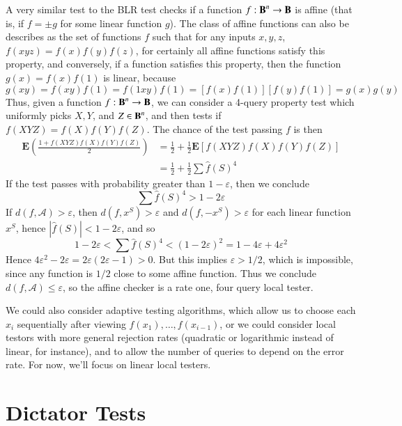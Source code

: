 \begin{example}
    A very similar test to the BLR test checks if a function $f: \operatorname{\mathbf{B}}^n \to \operatorname{\mathbf{B}}$ is affine (that is, if $f = \pm g$ for some linear function $g$). The class of affine functions can also be describes as the set of functions $f$ such that for any inputs $x,y,z$, $f(xyz) = f(x)f(y)f(z)$, for certainly all affine functions satisfy this property, and conversely, if a function satisfies this property, then the function $g(x) = f(x) f(1)$ is linear, because
    \[ g(xy) = f(xy) f(1) = f(1xy) f(1) = [f(x) f(1)] [f(y) f(1)] = g(x) g(y) \]
    Thus, given a function $f: \operatorname{\mathbf{B}}^n \to \operatorname{\mathbf{B}}$, we can consider a 4-query property test which uniformly picks $X,Y$, and $Z \in \operatorname{\mathbf{B}}^n$, and then tests if $f(XYZ) = f(X)f(Y)f(Z)$. The chance of the test passing $f$ is then
    \begin{align*}
        \mathbf{E} \left( \frac{1 + f(XYZ) f(X) f(Y) f(Z)}{2} \right) &= \frac{1}{2} + \frac{1}{2} \mathbf{E}[f(XYZ) f(X) f(Y) f(Z)]\\
        &= \frac{1}{2} + \frac{1}{2} \sum \widehat{f}(S)^4
    \end{align*}
    If the test passes with probability greater than $1 - \varepsilon$, then we conclude
    \[ \sum \widehat{f}(S)^4 > 1 - 2 \varepsilon \]
    If $d(f,\mathcal{A}) > \varepsilon$, then $d(f,x^S) > \varepsilon$ and $d(f,-x^S) > \varepsilon$ for each linear function $x^S$, hence $|\widehat{f}(S)| < 1 - 2 \varepsilon$, and so
    \[ 1 - 2 \varepsilon < \sum \widehat{f}(S)^4 < (1 - 2 \varepsilon)^2 = 1 - 4 \varepsilon + 4 \varepsilon^2 \]
    Hence $4 \varepsilon^2 - 2 \varepsilon = 2\varepsilon(2\varepsilon - 1) > 0$. But this implies $\varepsilon > 1/2$, which is impossible, since any function is $1/2$ close to some affine function. Thus we conclude $d(f,\mathcal{A}) \leq \varepsilon$, so the affine checker is a rate one, four query local tester.
\end{example}

We could also consider adaptive testing algorithms, which allow us to choose each $x_i$ sequentially after viewing $f(x_1), \dots, f(x_{i-1})$, or we could consider local testors with more general rejection rates (quadratic or logarithmic instead of linear, for instance), and to allow the number of queries to depend on the error rate. For now, we'll focus on linear local testers.

\section{Dictator Tests}


